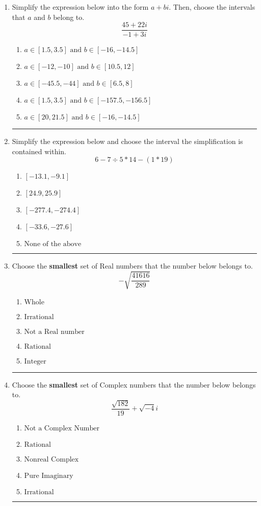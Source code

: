 \documentclass[14pt]{extbook}
\newcommand{\litem}[1]{\item#1\hspace*{-1cm}\rule{\textwidth}{0.4pt}}
\begin{document}
\begin{enumerate}
{\begin{enumerate}[label=\Alph*.]
\end{enumerate} }
\litem{
Simplify the expression below into the form $a+bi$. Then, choose the intervals that $a$ and $b$ belong to.\[ \frac{45 + 22 i}{-1 + 3 i} \]\begin{enumerate}[label=\Alph*.]
\item \( a \in [1.5, 3.5] \text{ and } b \in [-16, -14.5] \)
\item \( a \in [-12, -10] \text{ and } b \in [10.5, 12] \)
\item \( a \in [-45.5, -44] \text{ and } b \in [6.5, 8] \)
\item \( a \in [1.5, 3.5] \text{ and } b \in [-157.5, -156.5] \)
\item \( a \in [20, 21.5] \text{ and } b \in [-16, -14.5] \)

\end{enumerate} }
\litem{
Simplify the expression below and choose the interval the simplification is contained within.\[ 6 - 7 \div 5 * 14 - (1 * 19) \]\begin{enumerate}[label=\Alph*.]
\item \( [-13.1, -9.1] \)
\item \( [24.9, 25.9] \)
\item \( [-277.4, -274.4] \)
\item \( [-33.6, -27.6] \)
\item \( \text{None of the above} \)

\end{enumerate} }
\litem{
Choose the \textbf{smallest} set of Real numbers that the number below belongs to.\[ -\sqrt{\frac{41616}{289}} \]\begin{enumerate}[label=\Alph*.]
\item \( \text{Whole} \)
\item \( \text{Irrational} \)
\item \( \text{Not a Real number} \)
\item \( \text{Rational} \)
\item \( \text{Integer} \)

\end{enumerate} }
\litem{
Choose the \textbf{smallest} set of Complex numbers that the number below belongs to.\[ \frac{\sqrt{182}}{19}+\sqrt{-4}i \]\begin{enumerate}[label=\Alph*.]
\item \( \text{Not a Complex Number} \)
\item \( \text{Rational} \)
\item \( \text{Nonreal Complex} \)
\item \( \text{Pure Imaginary} \)
\item \( \text{Irrational} \)


\end{enumerate}}
\end{enumerate}
\end{document}
